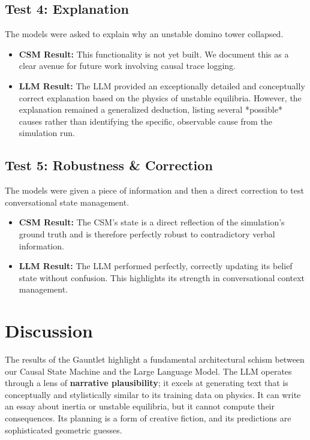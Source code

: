 \documentclass[11pt, letterpaper]{article}
\begin{document}
\subsection{Test 4: Explanation}
The models were asked to explain why an unstable domino tower collapsed.
\begin{itemize}
    \item \textbf{CSM Result:} This functionality is not yet built. We document this as a clear avenue for future work involving causal trace logging.
    \item \textbf{LLM Result:} The LLM provided an exceptionally detailed and conceptually correct explanation based on the physics of unstable equilibria. However, the explanation remained a generalized deduction, listing several *possible* causes rather than identifying the specific, observable cause from the simulation run.
\end{itemize}

\subsection{Test 5: Robustness \& Correction}
The models were given a piece of information and then a direct correction to test conversational state management.
\begin{itemize}
    \item \textbf{CSM Result:} The CSM's state is a direct reflection of the simulation's ground truth and is therefore perfectly robust to contradictory verbal information.
    \item \textbf{LLM Result:} The LLM performed perfectly, correctly updating its belief state without confusion. This highlights its strength in conversational context management.
\end{itemize}

\section{Discussion}
The results of the Gauntlet highlight a fundamental architectural schism between our Causal State Machine and the Large Language Model. The LLM operates through a lens of \textbf{narrative plausibility}; it excels at generating text that is conceptually and stylistically similar to its training data on physics. It can write an essay about inertia or unstable equilibria, but it cannot compute their consequences. Its planning is a form of creative fiction, and its predictions are sophisticated geometric guesses.
\end{document}
